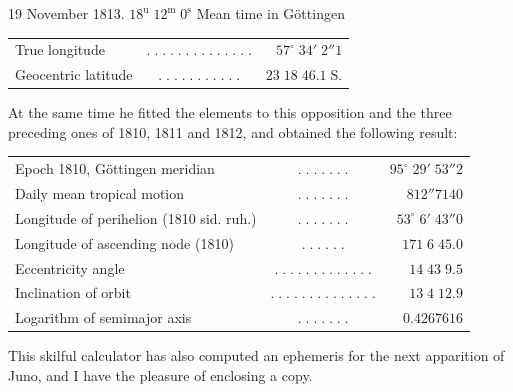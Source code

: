 \begin{center}19 November 1813. $18^{\mathrm u}\;12^{\mathrm m}\;0^{\mathrm s}$ Mean time in Göttingen\end{center}
\begin{center}\fontsize{10}{12}\selectfont\setlength{\tabcolsep}{2pt}\renewcommand{\arraystretch}{1.15}\begin{tabular}{lcr}
True longitude & $.\;.\;.\;.\;.\;.\;.\;.\;.\;.\;.\;.\;.\;.$ & $57^\circ\;34'\;2''1$\\
Geocentric latitude & $.\;.\;.\;.\;.\;.\;.\;.\;.\;.\;.$ & $23\;18\;46.1\;\mathrm{S.}$\\
\end{tabular}\end{center}

\par\indent At the same time he fitted the elements to this opposition and the three preceding ones of 1810, 1811 and 1812, and obtained the following result:

\begin{center}\fontsize{9}{11}\selectfont\setlength{\tabcolsep}{2pt}\renewcommand{\arraystretch}{1.15}\begin{tabular}{lcr}
Epoch 1810, Göttingen meridian & $.\;.\;.\;.\;.\;.\;.$ & $95^\circ\;29'\;53''2$\\
Daily mean tropical motion & $.\;.\;.\;.\;.\;.\;.$ & $812''7140$\\
Longitude of perihelion (1810 sid. ruh.) & $.\;.\;.\;.\;.\;.\;.$ & $53^\circ\;6'\;43''0$\\
Longitude of ascending node (1810) & $.\;.\;.\;.\;.\;.$ & $171\;6\;45.0$\\
Eccentricity angle & $.\;.\;.\;.\;.\;.\;.\;.\;.\;.\;.\;.\;.$ & $14\;43\;9.5$\\
Inclination of orbit & $.\;.\;.\;.\;.\;.\;.\;.\;.\;.\;.\;.\;.\;.$ & $13\;4\;12.9$\\
Logarithm of semimajor axis & $.\;.\;.\;.\;.\;.\;.$ & $0.4267616$\\
\end{tabular}\end{center}

\par\indent This skilful calculator has also computed an ephemeris for the next apparition of Juno, and I have the pleasure of enclosing a copy.

